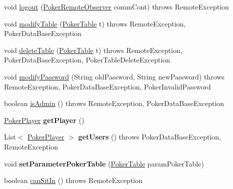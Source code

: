 \begin{DoxyCompactItemize}
\item 
void \hyperlink{classhu_1_1elte_1_1bfw1p6_1_1poker_1_1client_1_1model_1_1_model_a4ae261af4206757a63d37b38e2ba1ede}{logout} (\hyperlink{interfacehu_1_1elte_1_1bfw1p6_1_1poker_1_1client_1_1observer_1_1_poker_remote_observer}{Poker\+Remote\+Observer} comm\+Cont)  throws Remote\+Exception 
\item 
void \hyperlink{classhu_1_1elte_1_1bfw1p6_1_1poker_1_1client_1_1model_1_1_model_a8e770c91cea9d2173ce7a7ff0bf213cb}{modify\+Table} (\hyperlink{classhu_1_1elte_1_1bfw1p6_1_1poker_1_1model_1_1entity_1_1_poker_table}{Poker\+Table} t)  throws Remote\+Exception, Poker\+Data\+Base\+Exception 
\item 
void \hyperlink{classhu_1_1elte_1_1bfw1p6_1_1poker_1_1client_1_1model_1_1_model_a12d0623b5ec976acf7b77d66bc2cf432}{delete\+Table} (\hyperlink{classhu_1_1elte_1_1bfw1p6_1_1poker_1_1model_1_1entity_1_1_poker_table}{Poker\+Table} t)  throws Remote\+Exception, Poker\+Data\+Base\+Exception, Poker\+Table\+Delete\+Exception 
\item 
void \hyperlink{classhu_1_1elte_1_1bfw1p6_1_1poker_1_1client_1_1model_1_1_model_af9091061670eecdfc81f74aafb44f9d6}{modify\+Password} (String old\+Password, String new\+Password)  throws Remote\+Exception, Poker\+Data\+Base\+Exception, Poker\+Invalid\+Password 
\item 
boolean \hyperlink{classhu_1_1elte_1_1bfw1p6_1_1poker_1_1client_1_1model_1_1_model_a4709ea27bd0a24330b5558e7960c48fd}{is\+Admin} ()  throws Remote\+Exception, Poker\+Data\+Base\+Exception 
\item 
\hypertarget{classhu_1_1elte_1_1bfw1p6_1_1poker_1_1client_1_1model_1_1_model_ab0b6285b1efa117cbae97efca88c60ab}{}\hyperlink{classhu_1_1elte_1_1bfw1p6_1_1poker_1_1model_1_1entity_1_1_poker_player}{Poker\+Player} {\bfseries get\+Player} ()\label{classhu_1_1elte_1_1bfw1p6_1_1poker_1_1client_1_1model_1_1_model_ab0b6285b1efa117cbae97efca88c60ab}

\item 
\hypertarget{classhu_1_1elte_1_1bfw1p6_1_1poker_1_1client_1_1model_1_1_model_a5e51b3cbf72d188595c9834e39c2bd14}{}List$<$ \hyperlink{classhu_1_1elte_1_1bfw1p6_1_1poker_1_1model_1_1entity_1_1_poker_player}{Poker\+Player} $>$ {\bfseries get\+Users} ()  throws Poker\+Data\+Base\+Exception, Remote\+Exception \label{classhu_1_1elte_1_1bfw1p6_1_1poker_1_1client_1_1model_1_1_model_a5e51b3cbf72d188595c9834e39c2bd14}

\item 
\hypertarget{classhu_1_1elte_1_1bfw1p6_1_1poker_1_1client_1_1model_1_1_model_ac24d0e27b8aeed86d8e3656662968fb3}{}void {\bfseries set\+Parameter\+Poker\+Table} (\hyperlink{classhu_1_1elte_1_1bfw1p6_1_1poker_1_1model_1_1entity_1_1_poker_table}{Poker\+Table} param\+Poker\+Table)\label{classhu_1_1elte_1_1bfw1p6_1_1poker_1_1client_1_1model_1_1_model_ac24d0e27b8aeed86d8e3656662968fb3}

\item 
boolean \hyperlink{classhu_1_1elte_1_1bfw1p6_1_1poker_1_1client_1_1model_1_1_model_a722c16838faaa5df1fbb6d1d012c4442}{can\+Sit\+In} ()  throws Remote\+Exception 
\end{DoxyCompactItemize}

